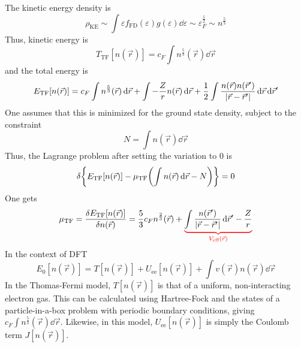 \documentclass[12pt,a4paper,titlepage]{article}
\newcommand{\trm}[1]{\textrm{#1}} %
\begin{document}
The kinetic energy density is
\begin{equation}
\rho_{\trm{KE}}\sim\int\varepsilon f_{\trm{FD}}(\varepsilon)g(\varepsilon)\dd{\varepsilon}\sim\varepsilon_{F}^{\frac{5}{2}}\sim n^{\frac{5}{3}}
\end{equation}
Thus, kinetic energy is
\begin{equation}
T_{\trm{TF}}[n(\vec{r})]=c_{F}\int n^{\frac{5}{3}}(\vec{r})\dd{\vec{r}}
\end{equation}
and the total energy is
\begin{equation}
E_{\trm{TF}}[n(\vec{r})]=c_{F}\int n^{\frac{5}{3}}(\vec{r})\dd{\vec{r}}+\int-\frac{Z}{r}n(\vec{r})\dd{\vec{r}}+\frac{1}{2}\int\frac{n(\vec{r})n(\vec{r}^{\prime})}{\abs{\vec{r}-\vec{r}^{\prime}}}\dd{\vec{r}}\dd{\vec{r}^{\prime}}
\end{equation}
One assumes that this is minimized for the ground state density, subject to the constraint
\begin{equation}
N=\int n(\vec{r})\dd{\vec{r}}
\end{equation}
Thus, the Lagrange problem after setting the variation to 0 is
\begin{equation}
\var{\qty{E_{\trm{TF}}[n(\vec{r})]-\mu_{\trm{TF}}\qty(\int n(\vec{r})\dd{\vec{r}}-N)}}=0
\end{equation}
One gets
\begin{equation}
\mu_{\trm{TF}}=\fdv{E_{\trm{TF}}[n(\vec{r})]}{n(\vec{r})}=\frac{5}{3}c_{F}n^{\frac{2}{3}}(\vec{r})+{\color{red}\underbrace{\color{black}\int\frac{n(\vec{r}^{\prime})}{\abs{\vec{r}-\vec{r}^{\prime}}}\dd{\vec{r}^{\prime}}-\frac{Z}{r}}_{V_{\trm{eff}}(\vec{r})}}
\end{equation}
In the context of DFT
\begin{equation}
E_{0}[n(\vec{r})]=T[n(\vec{r})]+U_{\trm{ee}}[n(\vec{r})]+\int v(\vec{r})n(\vec{r})\dd{\vec{r}}
\end{equation}
In the Thomas-Fermi model, $T[n(\vec{r})]$ is that of a uniform, non-interacting electron gas. This can be calculated using Hartree-Fock and the states of a particle-in-a-box problem with periodic boundary conditions, giving $c_{F}\int n^{\frac{5}{3}}(\vec{r})\dd{\vec{r}}$. Likewise, in this model, $U_{\trm{ee}}[n(\vec{r})]$ is simply the Coulomb term $J[n(\vec{r})]$.\\
\end{document}
